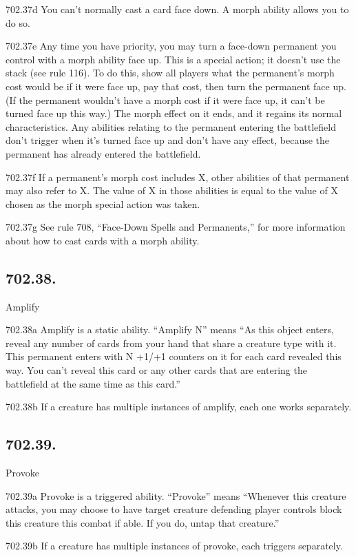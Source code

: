 702.37d You can’t normally cast a card face down. A morph ability allows you to do so.

702.37e Any time you have priority, you may turn a face-down permanent you control with a morph ability face up. This is a special action; it doesn’t use the stack (see rule 116). To do this, show all players what the permanent’s morph cost would be if it were face up, pay that cost, then turn the permanent face up. (If the permanent wouldn’t have a morph cost if it were face up, it can’t be turned face up this way.) The morph effect on it ends, and it regains its normal characteristics. Any abilities relating to the permanent entering the battlefield don’t trigger when it’s turned face up and don’t have any effect, because the permanent has already entered the battlefield.

702.37f If a permanent’s morph cost includes X, other abilities of that permanent may also refer to X. The value of X in those abilities is equal to the value of X chosen as the morph special action was taken.

702.37g See rule 708, “Face-Down Spells and Permanents,” for more information about how to cast cards with a morph ability.

\subsection*{702.38.}
Amplify

702.38a Amplify is a static ability. “Amplify N” means “As this object enters, reveal any number of cards from your hand that share a creature type with it. This permanent enters with N +1/+1 counters on it for each card revealed this way. You can’t reveal this card or any other cards that are entering the battlefield at the same time as this card.”

702.38b If a creature has multiple instances of amplify, each one works separately.

\subsection*{702.39.}
Provoke

702.39a Provoke is a triggered ability. “Provoke” means “Whenever this creature attacks, you may choose to have target creature defending player controls block this creature this combat if able. If you do, untap that creature.”

702.39b If a creature has multiple instances of provoke, each triggers separately.

